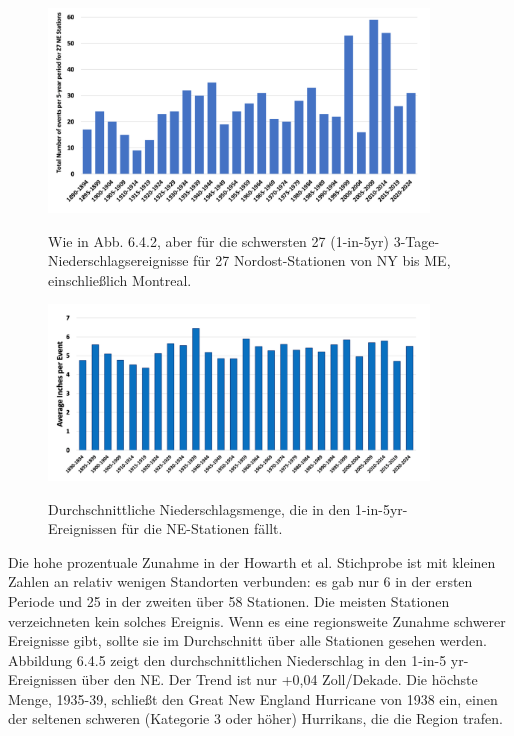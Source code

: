 \documentclass[12pt,paper=a4,DIV=12,parskip=never,chapterprefix=false,headings=standardclasses]{scrreprt}
\begin{document}
\begin{figure}[H]
\begin{center}
\includegraphics[width=0.9\textwidth]{bilder/bilderKlima-0058.png}\\[1cm]
\end{center}
\caption{Wie in Abb. 6.4.2, aber für die schwersten 27 (1-in-5yr) 3-Tage-Niederschlagsereignisse für 27 Nordost-Stationen von NY bis ME, einschließlich Montreal.}
\end{figure}
\begin{figure}[H]
\begin{center}
\includegraphics[width=0.9\textwidth]{bilder/bilderKlima-0059.png}\\[1cm]
\end{center}
\caption{Durchschnittliche Niederschlagsmenge, die in den 1-in-5yr-Ereignissen für die NE-Stationen fällt.}
\end{figure}

Die hohe prozentuale Zunahme in der Howarth et al. Stichprobe ist mit kleinen Zahlen an relativ wenigen Standorten verbunden: es gab nur 6 in der ersten Periode und 25 in der zweiten über 58 Stationen. Die meisten Stationen verzeichneten kein solches Ereignis. Wenn es eine regionsweite Zunahme schwerer Ereignisse gibt, sollte sie im Durchschnitt über alle Stationen gesehen werden. Abbildung 6.4.5 zeigt den durchschnittlichen Niederschlag in den 1-in-5 yr-Ereignissen über den NE. Der Trend ist nur +0,04 Zoll/Dekade. Die höchste Menge, 1935-39, schließt den Great New England Hurricane von 1938 ein, einen der seltenen schweren (Kategorie 3 oder höher) Hurrikans, die die Region trafen.
\end{document}
